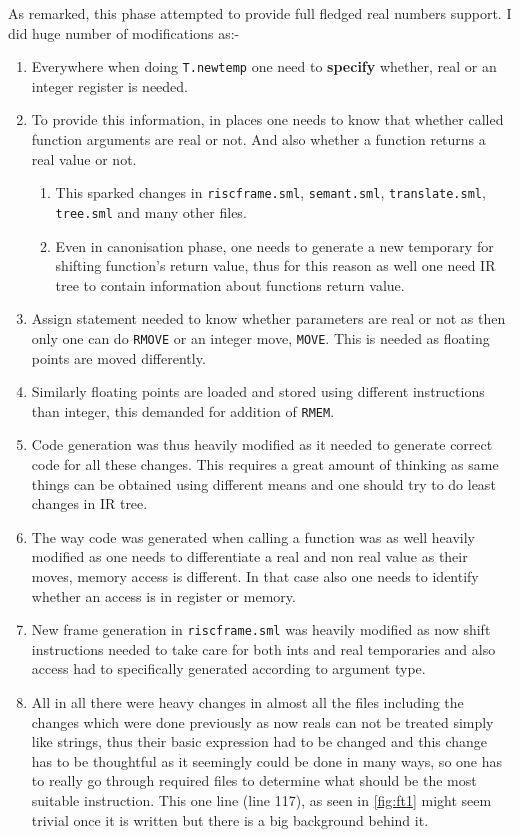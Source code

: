 As remarked, this phase attempted to provide full fledged real numbers support. I did huge number of modifications as:- 

\begin{enumerate}
  \item Everywhere when doing \texttt{T.newtemp} one need to \textbf{specify} whether, real or an integer register is needed. 
  \item To provide this information, in places one needs to know that whether called function arguments are real or not. And also whether a function returns a real value or not. 
    \begin{enumerate}
      \item This sparked changes in \texttt{riscframe.sml}, \texttt{semant.sml}, \texttt{translate.sml}, \texttt{tree.sml} and many other files.
      \item Even in canonisation phase, one needs to generate a new temporary for shifting function's return value, thus for this reason as well one need IR tree to contain information about functions return value.
    \end{enumerate}
  \item Assign statement needed to know whether parameters are real or not as then only one can do \texttt{RMOVE} or an integer move, \texttt{MOVE}. This is needed as floating points are moved differently.
  \item Similarly floating points are loaded and stored using different instructions than integer, this demanded for addition of \texttt{RMEM}.
  \item Code generation was thus heavily modified as it needed to generate correct code for all these changes. This requires a great amount of thinking as same things can be obtained using different means and one should try to do least changes in IR tree. 
  \item The way code was generated when calling a function was as well heavily modified as one needs to differentiate a real and non real value as their moves, memory access is different. In that case also one needs to identify whether an access is in register or memory.
  \item New frame generation in \texttt{riscframe.sml} was heavily modified as now shift instructions needed to take care for both ints and real temporaries and also access had to specifically generated according to argument type.
  \item All in all there were heavy changes in almost all the files including the changes which were done previously as now reals can not be treated simply like strings, thus their basic expression had to be changed and this change has to be thoughtful as it seemingly could be done in many ways, so one has to really go through required files to determine what should be the most suitable instruction. This one line (line 117), as seen in \ref{fig:ft1} might seem trivial once it is written but there is a big background behind it.

\end{enumerate}
